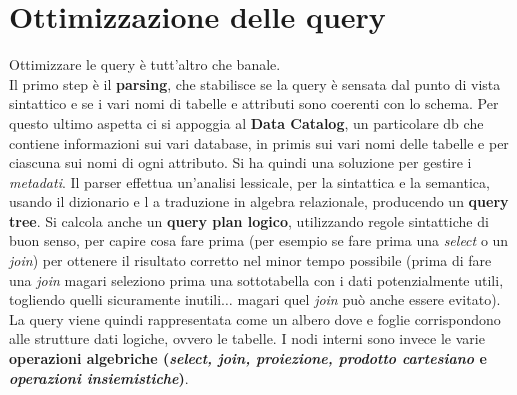 \documentclass[a4paper,12pt, oneside]{book}
\begin{document}
\section{Ottimizzazione delle query}
Ottimizzare le query è tutt'altro che banale.\\
Il primo step è il \textbf{parsing}, che stabilisce se la query è sensata dal
punto di vista sintattico e se i vari nomi di tabelle e attributi sono coerenti
con lo schema. Per questo ultimo aspetta ci si appoggia al \textbf{Data
  Catalog}, un particolare db che contiene informazioni sui vari database, in
primis sui vari nomi delle tabelle e per ciascuna sui nomi di ogni attributo. Si
ha quindi una soluzione per gestire i \textit{metadati}. Il parser effettua
un'analisi lessicale, per la sintattica e la semantica, usando il dizionario e
l a traduzione in algebra relazionale, producendo un \textbf{query tree}. Si
calcola anche un \textbf{query plan logico}, utilizzando regole sintattiche di
buon senso, per capire cosa fare prima (per esempio se fare prima una
\textit{select} o un \textit{join}) per ottenere il risultato corretto nel minor
tempo possibile (prima di fare una \textit{join} magari seleziono prima una
sottotabella con i dati potenzialmente utili, togliendo quelli sicuramente
inutili$\ldots$ magari quel \textit{join} può anche essere evitato). La query
viene quindi rappresentata come un albero dove e foglie corrispondono alle
strutture dati logiche, ovvero le tabelle. I nodi interni sono invece le varie
\textbf{operazioni algebriche (\textit{select, join, proiezione, prodotto
    cartesiano} e \textit{operazioni insiemistiche})}.
\newpage
\end{document}
